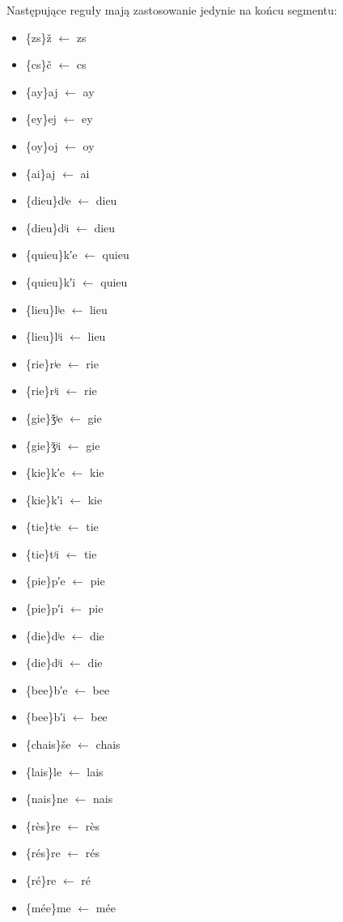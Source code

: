 \documentclass{article}
\begin{document}
Następujące reguły mają zastosowanie jedynie na końcu segmentu:
\begin{multicols}{3}\begin{itemize}
\item \{zs\}ž $\leftarrow$ zs
\item \{cs\}č $\leftarrow$ cs
\item \{ay\}aj $\leftarrow$ ay
\item \{ey\}ej $\leftarrow$ ey
\item \{oy\}oj $\leftarrow$ oy
\item \{ai\}aj $\leftarrow$ ai
\item \{dieu\}dʲe $\leftarrow$ dieu
\item \{dieu\}dʲi $\leftarrow$ dieu
\item \{quieu\}k′e $\leftarrow$ quieu
\item \{quieu\}k′i $\leftarrow$ quieu
\item \{lieu\}lʲe $\leftarrow$ lieu
\item \{lieu\}lʲi $\leftarrow$ lieu
\item \{rie\}rʲe $\leftarrow$ rie
\item \{rie\}rʲi $\leftarrow$ rie
\item \{gie\}ǯʲe $\leftarrow$ gie
\item \{gie\}ǯʲi $\leftarrow$ gie
\item \{kie\}k′e $\leftarrow$ kie
\item \{kie\}k′i $\leftarrow$ kie
\item \{tie\}tʲe $\leftarrow$ tie
\item \{tie\}tʲi $\leftarrow$ tie
\item \{pie\}p′e $\leftarrow$ pie
\item \{pie\}p′i $\leftarrow$ pie
\item \{die\}dʲe $\leftarrow$ die
\item \{die\}dʲi $\leftarrow$ die
\item \{bee\}b′e $\leftarrow$ bee
\item \{bee\}b′i $\leftarrow$ bee
\item \{chais\}še $\leftarrow$ chais
\item \{lais\}le $\leftarrow$ lais
\item \{nais\}ne $\leftarrow$ nais
\item \{rès\}re $\leftarrow$ rès
\item \{rés\}re $\leftarrow$ rés
\item \{ré\}re $\leftarrow$ ré
\item \{mée\}me $\leftarrow$ mée

\end{itemize}
\end{multicols}
\end{document}
